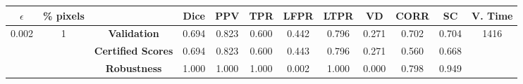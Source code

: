 \begin{longtable}{ c  c | c | c  c  c  c  c  c  c c c}
\toprule \textbf{$\epsilon$} & \textbf{\% pixels} & & \textbf{Dice} & \textbf{PPV} & \textbf{TPR} & \textbf{LFPR} & \textbf{LTPR} & \textbf{VD} & \textbf{CORR} & \textbf{SC} & \textbf{V. Time} \\
\midrule 
\multirow{3}{*}{0.002}  & \multirow{3}{*}{1} &\textbf{Validation} & 0.694 & 0.823 & 0.600 & 0.442 & 0.796 & 0.271 & 0.702 & 0.704 & \multirow{3}{*}{1416} \\
 & & \textbf{Certified Scores} & 0.694 & 0.823 & 0.600 & 0.443 & 0.796 & 0.271 & 0.560 & 0.668 & \\
& & \textbf{Robustness} & 1.000 & 1.000 & 1.000 & 0.002 & 1.000 & 0.000 & 0.798 & 0.949 & \\
\end{longtable}
